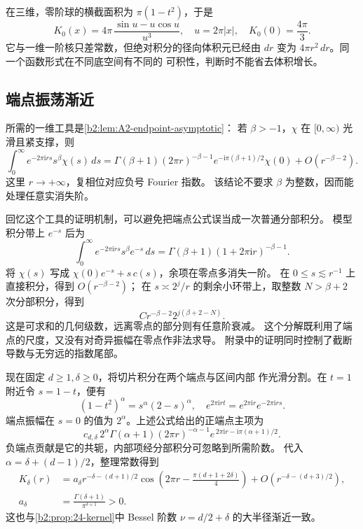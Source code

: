 \ProseParagraphBreak
在三维，零阶球的横截面积为 \(\pi(1-t^2)\)，于是
\[
 K_0(x)=4\pi\,\frac{\sin u-u\cos u}{u^3},
 \quad u=2\pi|x|,\quad K_0(0)=\frac{4\pi}{3}.
\]
它与一维一阶核只差常数，但绝对积分的径向体积元已经由 \(dr\)
变为 \(4\pi r^2\,dr\)。同一个函数形式在不同底空间有不同的
可积性，判断时不能省去体积增长。

\subsection{端点振荡渐近}
\label{b2:subsec:240202}

所需的一维工具是\cref{b2:lem:A2-endpoint-asymptotic}：
若 \(\beta>-1\)，\(\chi\) 在 \([0,\infty)\) 光滑且紧支撑，则
\[
 \int_0^\infty e^{-2\pi\mathrm i rs}s^\beta\chi(s)\,ds
 =\Gamma(\beta+1)(2\pi r)^{-\beta-1}
       e^{-\mathrm i\pi(\beta+1)/2}\chi(0)
       +O(r^{-\beta-2}).
\]
这里 \(r\to+\infty\)，复相位对应负号 Fourier 指数。
该结论不要求 \(\beta\) 为整数，因而能处理任意实消失阶。

\ProseParagraphBreak
回忆这个工具的证明机制，可以避免把端点公式误当成一次普通分部积分。
模型积分带上 \(e^{-s}\) 后为
\[
 \int_0^\infty e^{-2\pi\mathrm i rs}s^\beta e^{-s}\,ds
       =\Gamma(\beta+1)(1+2\pi\mathrm i r)^{-\beta-1}.
\]
将 \(\chi(s)\) 写成
\(\chi(0)e^{-s}+s\,c(s)\)，余项在零点多消失一阶。
在 \(0\leq s\lesssim r^{-1}\) 上直接积分，得到 \(O(r^{-\beta-2})\)；
在 \(s\asymp2^j/r\) 的剩余小环带上，取整数 \(N>\beta+2\)
次分部积分，得到
\[
 C r^{-\beta-2}2^{j(\beta+2-N)}.
\]
这是可求和的几何级数，远离零点的部分则有任意阶衰减。
这个分解既利用了端点的尺度，又没有对奇异振幅在零点作非法求导。
附录中的证明同时控制了截断导数与无穷远的指数尾部。

\ProseParagraphBreak
现在固定 \(d\geq1,\delta\geq0\)，将切片积分在两个端点与区间内部
作光滑分割。在 \(t=1\) 附近令 \(s=1-t\)，便有
\[
 (1-t^2)^\alpha=s^\alpha(2-s)^\alpha,\quad
 e^{2\pi\mathrm i rt}=e^{2\pi\mathrm i r}e^{-2\pi\mathrm i rs}.
\]
端点振幅在 \(s=0\) 的值为 \(2^\alpha\)。上述公式给出的正端点主项为
\[
 c_{d,\delta}\,2^\alpha\Gamma(\alpha+1)
       (2\pi r)^{-\alpha-1}
       e^{\,2\pi\mathrm i r-\mathrm i\pi(\alpha+1)/2}.
\]
负端点贡献是它的共轭，内部项经分部积分可忽略到所需阶数。
代入 \(\alpha=\delta+(d-1)/2\)，整理常数得到
\[
 \begin{aligned}
 K_\delta(r)
 &=a_\delta r^{-\delta-(d+1)/2}
       \cos\!\left(2\pi r-\frac{\pi(d+1+2\delta)}4\right)
       +O(r^{-\delta-(d+3)/2}),\\
 a_\delta&=\frac{\Gamma(\delta+1)}{\pi^{\delta+1}}>0.
 \end{aligned}
\]
这也与\cref{b2:prop:24-kernel}中 Bessel 阶数
\(\nu=d/2+\delta\) 的大半径渐近一致。

